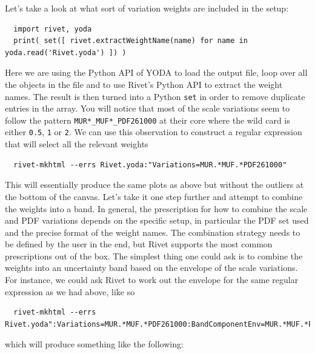 \documentclass[10pt,fleqn]{scrartcl}
\theoremstyle{exstyle}
\begin{document}
Let's take a look at what sort of variation weights are included in the setup:
\begin{verbatim}
  import rivet, yoda
  print( set([ rivet.extractWeightName(name) for name in yoda.read('Rivet.yoda') ]) )
\end{verbatim}
Here we are using the Python API of YODA to load the output file, loop over all
the objects in the file and to use Rivet's Python API to extract the weight names.
The result is then turned into a Python \verb|set| in order to remove duplicate entries in the array.
You will notice that most of the scale variations
seem to follow the pattern \verb|MUR*_MUF*_PDF261000| at their core where the wild card is either \verb|0.5|,
\verb|1| or \verb|2|. We can use this observation to construct a regular expression that will select 
all the relevant weights
\begin{verbatim}
  rivet-mkhtml --errs Rivet.yoda:"Variations=MUR.*MUF.*PDF261000"
\end{verbatim}
This will essentially produce the same plots as above but without the outliers
at the bottom of the canvas. Let's take it one step further and attempt to combine
the weights into a band. In general, the prescription for how to combine the
scale and PDF variations depends on the specific setup, 
in particular the PDF set used and the precise format of the weight names.
The combination strategy needs to be defined by the user in the end, but Rivet
supports the most common prescriptions out of the box. 
The simplest thing one could ask is to combine the weights into an uncertainty band
based on the envelope of the scale variations. For instance, we could ask Rivet to work out
the envelope for the same regular expression as we had above, like so
\begin{footnotesize}
\begin{verbatim}
  rivet-mkhtml --errs Rivet.yoda":Variations=MUR.*MUF.*PDF261000:BandComponentEnv=MUR.*MUF.*PDF261000"
\end{verbatim}
\end{footnotesize}
which will produce something like the following:
\end{document}
